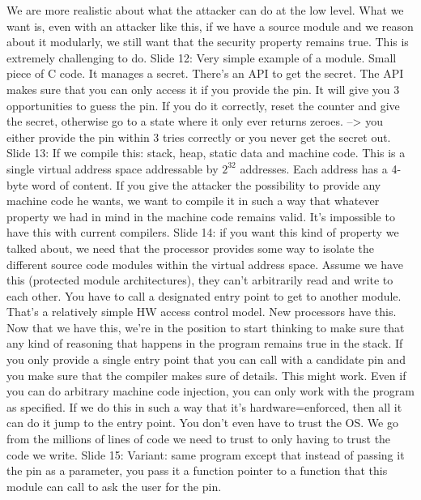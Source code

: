 \documentclass[10pt,a4paper]{report}
\begin{document}
We are more realistic about what the attacker can do at the low level. What we want is, even with an attacker like this, if we have a source module and we reason about it modularly, we still want that the security property remains true. This is extremely challenging to do. 
Slide 12: Very simple example of a module. Small piece of C code. It manages a secret. There's an API to get the secret. The API makes sure that you can only access it if you provide the pin. It will give you 3 opportunities to guess the pin. If you do it correctly, reset the counter and give the secret, otherwise go to a state where it only ever returns zeroes. --> you either provide the pin within 3 tries correctly or you never get the secret out. 
Slide 13: If we compile this: stack, heap, static data and machine code. This is a single virtual address space addressable by $2^{32}$ addresses. Each address has a 4-byte word of content. If you give the attacker the possibility to provide any machine code he wants, we want to compile it in such a way that whatever property we had in mind in the machine code remains valid. It's impossible to have this with current compilers.
Slide 14: if you want this kind of property we talked about, we need that the processor provides some way to isolate the different source code modules within the virtual address space. Assume we have this (protected module architectures), they can't arbitrarily read and write to each other. You have to call a designated entry point to get to another module. That's a relatively simple HW access control model. New processors have this.
Now that we have this, we're in the position to start thinking to make sure that any kind of reasoning that happens in the program remains true in the stack. If you only provide a single entry point that you can call with a candidate pin and you make sure that the compiler makes sure of details. This might work. Even if you can do arbitrary machine code injection, you can only work with the program as specified.
If we do this in such a way that it's hardware=enforced, then all it can do it jump to the entry point. You don't even have to trust the OS.
We go from the millions of lines of code we need to trust to only having to trust the code we write.
Slide 15: Variant: same program except that instead of passing it the pin as a parameter, you pass it a function pointer to a function that this module can call to ask the user for the pin. 
\end{document}
